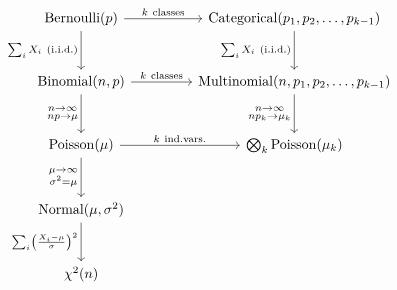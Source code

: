 \vspace{1cm}

$$
\begin{tikzcd}
    \mathrm{Bernoulli}(p)  \arrow{r}{k \ \mathrm{classes}}  \arrow[swap]{d}{\sum_i X_i \ \mathrm{(i.i.d.)}}   
        & [2em] \mathrm{Categorical}(p_1, p_2, \ldots, p_{k-1}) \arrow[swap]{d}{\sum_i X_i \ \mathrm{(i.i.d.)}}   \\ [1em]
    \mathrm{Binomial}(n, p) \arrow{r}{k \ \mathrm{classes}}  \arrow[swap]{d}{\substack{n\rightarrow\infty\\ np\rightarrow\mu}}
        & [2em] \mathrm{Multinomial}(n, p_1, p_2, \ldots, p_{k-1})  \arrow[swap]{d}{\substack{n\rightarrow\infty\\ np_k\rightarrow\mu_k}}   \\ [1em]
    \mathrm{Poisson}(\mu)  \arrow{r}{k \ \mathrm{ind. vars.}}  \arrow[swap]{d}{\substack{\mu\rightarrow\infty\\ \sigma^2 = \mu}}
        & [2em] \bigotimes_k \mathrm{Poisson}(\mu_k)                       \\ [1em]
    \mathrm{Normal}(\mu, \sigma^2)    \arrow[swap]{d}{\sum_i \left(\frac{X_i - \mu}{\sigma}\right)^2}
        &                                               \\ [1em]
    \chi^2(n)
        &                                               \\
\end{tikzcd}
$$
